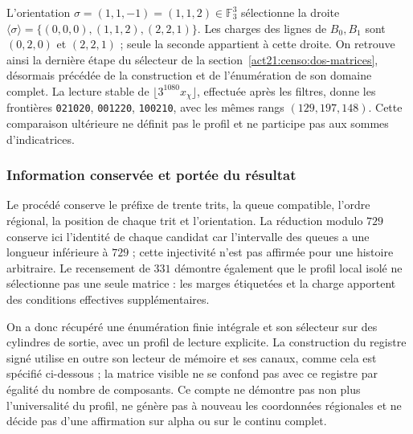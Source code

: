 L'orientation \(\sigma=(1,1,-1)=(1,1,2)\in\mathbb F_3^3\)
sélectionne la droite
\(\langle\sigma\rangle=\{(0,0,0),(1,1,2),(2,2,1)\}\).
Les charges des lignes de \(B_0,B_1\) sont \((0,2,0)\) et \((2,2,1)\) ;
seule la seconde appartient à cette droite. On retrouve ainsi la dernière étape
du sélecteur de la section~\ref{act21:censo:dos-matrices}, désormais précédée de
la construction et de l'énumération de son domaine complet. La lecture stable
de \(\lfloor3^{1080}x_\chi\rfloor\), effectuée après les filtres,
donne les frontières \texttt{021020}, \texttt{001220}, \texttt{100210},
avec les mêmes rangs \((129,197,148)\). Cette comparaison ultérieure ne définit
pas le profil et ne participe pas aux sommes d'indicatrices.

\subsubsection{Information conservée et portée du résultat}

Le procédé conserve le préfixe de trente trits, la queue compatible, l'ordre régional, la position de chaque trit et l'orientation. La réduction modulo \(729\) conserve ici l'identité de chaque candidat car l'intervalle des queues a une longueur inférieure à \(729\) ; cette injectivité n'est pas affirmée pour une histoire arbitraire. Le recensement de \(331\) démontre également que le profil local isolé ne sélectionne pas une seule matrice : les marges étiquetées et la charge apportent des conditions effectives supplémentaires.

On a donc récupéré une énumération finie intégrale et son sélecteur sur des cylindres de sortie, avec un profil de lecture explicite. La construction du registre signé utilise en outre son lecteur de mémoire et ses canaux, comme cela est spécifié ci-dessous ; la matrice visible ne se confond pas avec ce registre par égalité du nombre de composants. Ce compte ne démontre pas non plus l'universalité du profil, ne génère pas à nouveau les coordonnées régionales et ne décide pas d'une affirmation sur alpha ou sur le continu complet.
